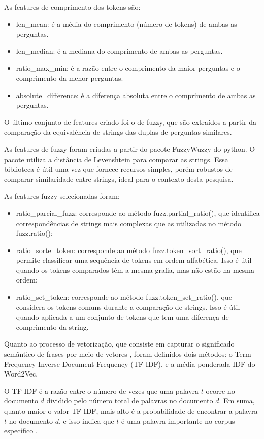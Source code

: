 \documentclass[conference]{IEEEtran}
\begin{document}
As features de comprimento dos tokens são:
\begin{itemize}
\item len\_mean: é a média do comprimento (número de tokens) de ambas as perguntas.
\item len\_median: é a mediana do comprimento de ambas as perguntas.
\item ratio\_max\_min: é a razão entre o comprimento da maior perguntas e o comprimento da menor perguntas.
\item absolute\_difference: é a diferença absoluta entre o comprimento de ambas as perguntas.
\end{itemize}

O último conjunto de features criado foi o de fuzzy, que são extraídos a partir da comparação da equivalência de strings das duplas de perguntas similares.

As features de fuzzy foram criadas a partir do pacote FuzzyWuzzy do python. O pacote utiliza a distância de Levenshtein \cite{Lev1966} para comparar as strings. Essa biblioteca é útil uma vez que fornece recursos simples, porém robustos de comparar similaridade entre strings, ideal para o contexto desta pesquisa.

As features fuzzy selecionadas foram:
\begin{itemize}
\item ratio\_parcial\_fuzz: corresponde ao método fuzz.partial\_ratio(), que identifica correspondências de strings mais complexas que as utilizadas no método fuzz.ratio();
\item ratio\_sorte\_token: corresponde ao método fuzz.token\_sort\_ratio(), que permite classificar uma sequência de tokens em ordem alfabética. Isso é útil quando os tokens comparados têm a mesma grafia, mas não estão na mesma ordem;
\item ratio\_set\_token: corresponde ao método fuzz.token\_set\_ratio(), que
considera os tokens comuns durante a comparação de strings. Isso é útil quando aplicada a um conjunto de tokens que tem uma diferença de comprimento da string.
\end{itemize}

Quanto ao processo de vetorização, que consiste em capturar o significado semântico de frases por meio de vetores \cite{Beng2018}, foram definidos dois métodos: o Term Frequency Inverse Document Frequency (TF-IDF), e a média ponderada IDF do Word2Vec. 

O TF-IDF é a razão entre o número de vezes que uma palavra $t$ ocorre no documento $d$ dividido pelo número total de palavras no documento $d$. Em suma, quanto maior o valor TF-IDF, mais alto é a probabilidade de encontrar a palavra $t$ no documento $d$, e isso indica que $t$ é uma palavra importante no corpus específico \cite{Salton1988}.
\end{document}
